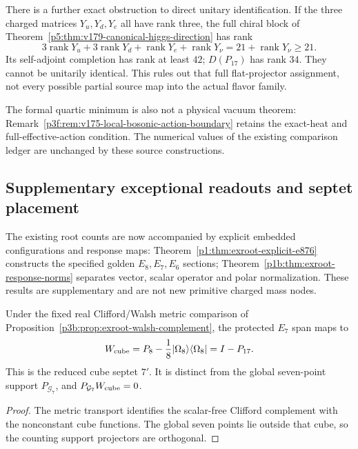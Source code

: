 \documentclass[11pt,a4paper]{article}
\begin{document}
There is a further exact obstruction to direct unitary identification.
If the three charged matrices \(Y_u,Y_d,Y_e\) all have rank three, the
full chiral block of
Theorem~\ref{p5:thm:v179-canonical-higgs-direction} has rank
\[
 3\operatorname{rank}Y_u+3\operatorname{rank}Y_d
 +\operatorname{rank}Y_e+\operatorname{rank}Y_\nu
 =21+\operatorname{rank}Y_\nu\ge21.
\]
Its self-adjoint completion has rank at least \(42\); \(D(P_{17})\)
has rank \(34\).  They cannot be unitarily identical.  This rules out
that full flat-projector assignment, not every possible partial source
map into the actual flavor family.

The formal quartic minimum is also not a physical vacuum theorem:
Remark~\ref{p3f:rem:v175-local-bosonic-action-boundary} retains the
exact-heat and full-effective-action condition.  The numerical values
of the existing comparison ledger are unchanged by these source
constructions.




\subsection{Supplementary exceptional readouts and septet placement}
\label{p6:app:exroot-readout-comparison}

The existing root counts are now accompanied by explicit embedded
configurations and response maps:
Theorem~\ref{p1:thm:exroot-explicit-e876} constructs the specified
golden \(E_8,E_7,E_6\) sections;
Theorem~\ref{p1b:thm:exroot-response-norms} separates vector, scalar
operator and polar normalization. These results are supplementary and
are not new primitive charged mass nodes.

\begin{corollary}
\label{p6:cor:exroot-septet-placement}
Under the fixed real Clifford/Walsh metric comparison of
Proposition~\ref{p3b:prop:exroot-walsh-complement}, the protected
\(E_7\) span maps to
\[
 W_{\rm cube}=P_8-\frac18|\Omega_8\rangle\langle\Omega_8|=I-P_{17}.
\]
This is the reduced cube septet \(7'\). It is distinct from the global
seven-point support \(P_{\mathcal G_7}\), and
\(P_{\mathcal G_7}W_{\rm cube}=0\).
\end{corollary}
\begin{proof}
The metric transport identifies the scalar-free Clifford complement
with the nonconstant cube functions. The global seven points lie
outside that cube, so the counting support projectors are orthogonal.
\end{proof}
\end{document}
